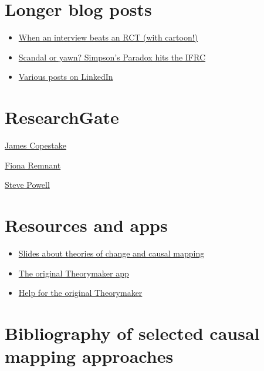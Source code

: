 \documentclass[
]{book}
\providecommand{\tightlist}{%
  \setlength{\itemsep}{0pt}\setlength{\parskip}{0pt}}
\begin{document}
\hypertarget{longer-blog-posts}{%
\section{Longer blog posts}\label{longer-blog-posts}}

\begin{itemize}
\tightlist
\item
  \href{http://www.pogol.net/public/article-evidence.html}{When an interview beats an RCT (with cartoon!)}
\item
  \href{http://www.pogol.net/_ideas/posts/2019-01-14-scandal-or-yawn-simpsons-paradox-hits-the-ifrc/}{Scandal or yawn? Simpson's Paradox hits the IFRC}
\item
  \href{https://www.linkedin.com/in/stevepowell99/detail/recent-activity/posts/}{Various posts on LinkedIn}
\end{itemize}

\hypertarget{researchgate}{%
\section{ResearchGate}\label{researchgate}}

\href{https://www.researchgate.net/profile/James_Copestake}{James Copestake}

\href{https://www.researchgate.net/profile/Fiona_Remnant}{Fiona Remnant}

\href{https://www.researchgate.net/profile/Steve_Powell2}{Steve Powell}

\hypertarget{resources-and-apps}{%
\section{Resources and apps}\label{resources-and-apps}}

\begin{itemize}
\tightlist
\item
  \href{http://slides.theorymaker.info/}{Slides about theories of change and causal mapping}
\item
  \href{http://www.pogol.net/_causal_mapping/theorymaker.info}{The original Theorymaker app}
\item
  \href{http://help.theorymaker.info/}{Help for the original Theorymaker}
\end{itemize}

\hypertarget{bibliography-of-selected-causal-mapping-approaches}{%
\section{Bibliography of selected causal mapping approaches}\label{bibliography-of-selected-causal-mapping-approaches}}
\end{document}
